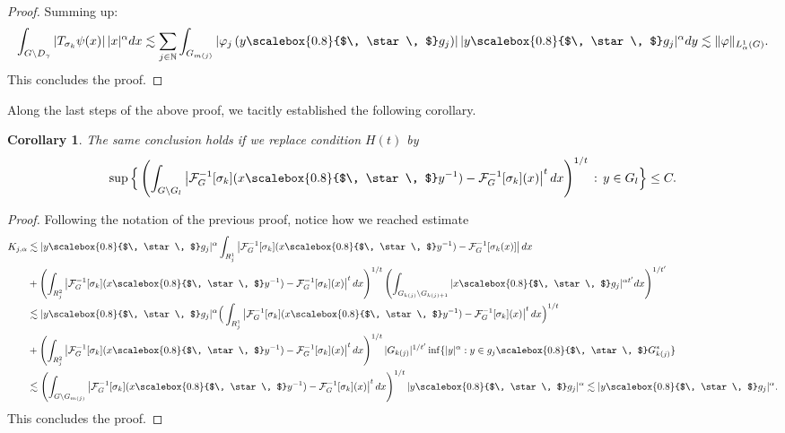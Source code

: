 \documentclass[12pt, reqno]{amsart}
\newtheorem{coro}[defi]{Corollary}
\newcommand{\1}{\mathds{1}}
\newcommand{\smallstar}{\scalebox{0.8}{$\, \star \, $}}
\begin{document}
\begin{proof}
Summing up:
\[
\int_{G \backslash D_{\gamma}}\left|T_{\sigma_{k}} \psi(x)\right| |x|^{\alpha} d x \lesssim \sum_{j \in \mathbb{N}} \int_{G_{m(j)}}\left|\varphi_{j}\left(y \smallstar g_{j}\right)\right| |y \smallstar g_j|^\alpha d y
\lesssim \|\varphi\|_{L_{\alpha}^{1}(G)}.
\]
This concludes the proof. 
\end{proof}

Along the last steps of the above proof, we tacitly established the following corollary.

\begin{coro}\label{coroalternativeestimate}
    The same conclusion holds if we replace condition $H(t)$ by
    \begin{equation}\label{eqaternativeLrproof}
        \sup\Big\{\left(\int_{G \setminus G_{l}} \left|\mathcal{F}_{G}^{-1}[ \sigma_{k}](x \smallstar y^{-1})-\mathcal{F}_{G}^{-1}[\sigma_{k}](x) \right|^{t} d x \right)^{1/t} \, : \, y \in G_l \Big\} \leq C .
    \end{equation}
\end{coro}

\begin{proof}
Following the notation of the previous proof, notice how we reached estimate
    \begin{align*}
K_{j,\alpha} &\lesssim |y \smallstar g_j|^\alpha \int_{R_j^1} \left|\mathcal{F}_{G}^{-1}[\sigma_{k}](x \smallstar y^{-1})-\mathcal{F}_{G}^{-1}[\sigma_{k}(x)]\right|d x \\  &+ \left(\int_{R_j^2} \left|\mathcal{F}_{G}^{-1}[\sigma_{k}](x \smallstar y^{-1})- \mathcal{F}_{G}^{-1} [\sigma_{k}](x)\right|^{t} d x \right)^{1/t} \left(\int_{G_{k(j)} \backslash G_{k(j)+1}}|x \smallstar g_{j}|^{\alpha t^{\prime}} d x\right)^{1 / t^{\prime}}  \\ &\lesssim |y \smallstar g_j|^\alpha \Big(  \int_{R_j^1} \left|\mathcal{F}_{G}^{-1}[\sigma_{k}](x \smallstar y^{-1})- \mathcal{F}_{G}^{-1}[ \sigma_{k}](x)\right|^t d x \Big)^{1/t} \\  &+ \left(\int_{R_j^2} \left|\mathcal{F}_{G}^{-1}[\sigma_{k}](x \smallstar y^{-1})- \mathcal{F}_{G}^{-1}[\sigma_{k}](x)\right|^{t} d x \right)^{1/t}|G_{k(j)}|^{1/t'} \inf\{|y|^{\alpha}:y\in g_j \smallstar G^{*}_{k(j)}\} \\ & \lesssim \left(\int_{G \setminus G_{m(j)}} \left|\mathcal{F}_{G}^{-1}[\sigma_{k}](x \smallstar y^{-1})- \mathcal{F}_{G}^{-1}[\sigma_{k}](x)\right|^{t} d x \right)^{1/t} |y \smallstar g_j|^\alpha \lesssim |y \smallstar g_j|^\alpha.
\end{align*}
This concludes the proof.
\end{proof}
\end{document}
